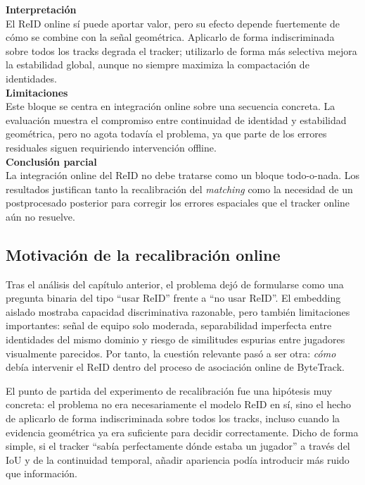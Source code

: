 \documentclass[../MAIN.tex]{subfiles}
\begin{document}
\begin{chaptertemplatebox}
		\textbf{Interpretación}\\
		El ReID online sí puede aportar valor, pero su efecto depende fuertemente de cómo se combine con la señal geométrica. Aplicarlo de forma indiscriminada sobre todos los tracks degrada el tracker; utilizarlo de forma más selectiva mejora la estabilidad global, aunque no siempre maximiza la compactación de identidades.\\[0.5em]
		
		\textbf{Limitaciones}\\
		Este bloque se centra en integración online sobre una secuencia concreta. La evaluación muestra el compromiso entre continuidad de identidad y estabilidad geométrica, pero no agota todavía el problema, ya que parte de los errores residuales siguen requiriendo intervención offline.\\[0.5em]
		
		\textbf{Conclusión parcial}\\
		La integración online del ReID no debe tratarse como un bloque todo-o-nada. Los resultados justifican tanto la recalibración del \textit{matching} como la necesidad de un postprocesado posterior para corregir los errores espaciales que el tracker online aún no resuelve.
	\end{chaptertemplatebox}
	
	\subsection{Motivación de la recalibración online}
	
	Tras el análisis del capítulo anterior, el problema dejó de formularse como una pregunta binaria del tipo ``usar ReID'' frente a ``no usar ReID''. El embedding aislado mostraba capacidad discriminativa razonable, pero también limitaciones importantes: señal de equipo solo moderada, separabilidad imperfecta entre identidades del mismo dominio y riesgo de similitudes espurias entre jugadores visualmente parecidos. Por tanto, la cuestión relevante pasó a ser otra: \emph{cómo} debía intervenir el ReID dentro del proceso de asociación online de ByteTrack.
	
	El punto de partida del experimento de recalibración fue una hipótesis muy concreta: el problema no era necesariamente el modelo ReID en sí, sino el hecho de aplicarlo de forma indiscriminada sobre todos los tracks, incluso cuando la evidencia geométrica ya era suficiente para decidir correctamente. Dicho de forma simple, si el tracker ``sabía perfectamente dónde estaba un jugador'' a través del IoU y de la continuidad temporal, añadir apariencia podía introducir más ruido que información.
	
\end{document}
